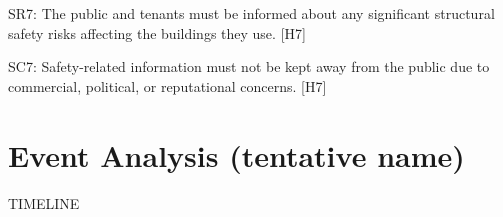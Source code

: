 \documentclass[12pt]{article}
\begin{document}
SR7: The public and tenants must be informed about any significant structural safety risks affecting the buildings they use. [H7]

SC7: Safety-related information must not be kept away from the public due to commercial, political, or reputational concerns. [H7]




\section{Event Analysis (tentative name)} %

TIMELINE
\end{document}
